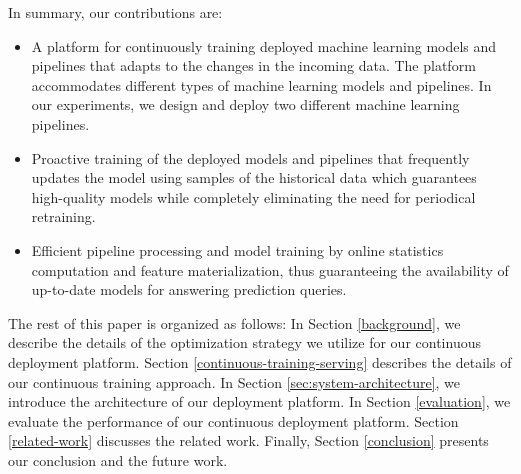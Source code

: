 In summary, our contributions are:
\begin{itemize}
\item A platform for continuously training deployed machine learning models and pipelines that adapts to the changes in the incoming data. The platform accommodates different types of machine learning models and pipelines. In our experiments, we design and deploy two different machine learning pipelines.
\item Proactive training of the deployed models and pipelines that frequently updates the model using samples of the historical data which guarantees high-quality models while completely eliminating the need for periodical retraining.
\item Efficient pipeline processing and model training by online statistics computation and feature materialization, thus guaranteeing the availability of up-to-date models for answering prediction queries.
\end{itemize}

The rest of this paper is organized as follows:
In Section \ref{background}, we describe the details of the optimization strategy we utilize for our continuous deployment platform.
Section \ref{continuous-training-serving} describes the details of our continuous training approach.
In Section \ref{sec:system-architecture}, we introduce the architecture of our deployment platform.
In Section \ref{evaluation}, we evaluate the performance of our continuous deployment platform.
Section \ref {related-work} discusses the related work.
Finally, Section \ref{conclusion} presents our conclusion and the future work.